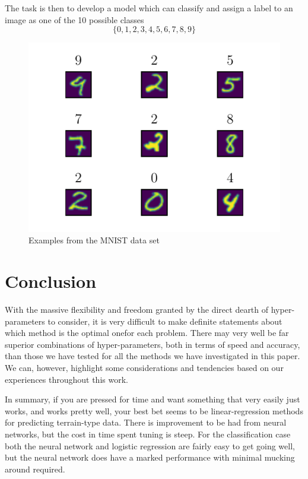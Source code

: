 \documentclass[reprint, english, nofootinbib]{revtex4-2}
\begin{document}
The task is then to develop a model which can classify and assign a label to an image as one of the 10 possible classes
\begin{equation*}
    \{0, 1, 2, 3, 4, 5, 6, 7, 8, 9\}
\end{equation*}
\begin{figure}[h!tb]
    \center
    \includegraphics[width=\columnwidth]{MNIST_example.pdf}
    \caption{\label{fig: MNIST example}Examples from the MNIST data set}
\end{figure}

\section{Conclusion}


With the massive flexibility and freedom granted by the direct dearth of hyper-parameters to consider, it is very difficult to make definite statements about which method is the optimal onefor each problem. There may very well be far superior combinations of hyper-parameters, both in terms of speed and accuracy, than those we have tested for all the methods we have investigated in this paper. We can, however, highlight some considerations and tendencies based on our experiences throughout this work.



In summary, if you are pressed for time and want something that very easily just works, and works pretty well, your best bet seems to be linear-regression methods for predicting terrain-type data. There is improvement to be had from neural networks, but the cost in time spent tuning is steep. For the classification case both the neural network and logistic regression are fairly easy to get going well, but the neural network does have a marked performance with minimal mucking around required.


\onecolumngrid

\newpage
\twocolumngrid
\appendix
\end{document}

